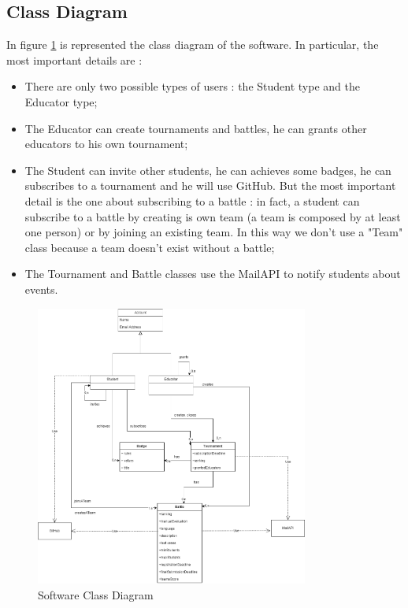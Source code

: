 \subsection{Class Diagram}
In figure \ref{fig:software-class-diagram} is represented the class diagram of the software. In particular, the most important details are :
\begin{itemize}
    \item There are only two possible types of users : the Student type and the Educator type;
    \item The Educator can create tournaments and battles, he can grants other educators to his own tournament;
    \item The Student can invite other students, he can achieves some badges, he can subscribes to a tournament and he will use GitHub. But the most important detail is the one about subscribing to a battle : in fact, a student can subscribe to a battle by creating is own team (a team is composed by at least one person) or by joining an existing team. In this way we don't use a "Team" class because a team doesn't exist without a battle;
    \item The Tournament and Battle classes use the MailAPI to notify students about events.

\end{itemize}
\begin{figure}[H]
    \centering
    \includegraphics[width=0.8\textwidth]{images/state_diagrams/ClassDiagram.png}
    \caption{Software Class Diagram}
    \label{fig:software-class-diagram}
\end{figure}

